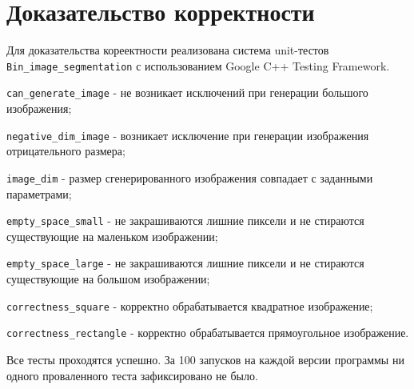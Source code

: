 \documentclass{report}
\begin{document}
\section*{Доказательство корректности}
Для доказательства кореектности реализована система unit-тестов \verb|Bin_image_segmentation| с использованием Google C++ Testing Framework.
\par \verb|can_generate_image| - не возникает исключений при генерации большого изображения;
\par \verb|negative_dim_image| - возникает исключение при генерации изображения отрицательного размера;
\par \verb|image_dim| - размер сгенерированного изображения совпадает с заданными параметрами;
\par \verb|empty_space_small| - не закрашиваются лишние пиксели и не стираются существующие на маленьком изображении;
\par \verb|empty_space_large| - не закрашиваются лишние пиксели и не стираются существующие на большом изображении;
\par \verb|correctness_square| - корректно обрабатывается квадратное изображение;
\par \verb|correctness_rectangle| - корректно обрабатывается прямоугольное изображение.
\par Все тесты проходятся успешно. За 100 запусков на каждой версии программы ни одного проваленного теста зафиксировано не было.
\newpage
\end{document}
